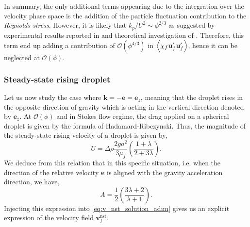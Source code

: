 In summary, the only additional terms appearing due to the integration over the velocity phase space is the addition of the particle fluctuation contribution to the \textit{Reynolds stress}. 
However, it is likely that $k_p/U^2 \sim \phi^{2/3}$ as suggested by experimental results reported in \citet{guazzelli2011fluctuations} and theoretical investigation of \citet{caflisch1985variance}.
Therefore, this term end up adding a contribution of $\mathcal{O}(\phi^{4/3})$ in $\left<\chi_f \textbf{u}_f'\textbf{u}_f'\right>$, hence it can be neglected at $\mathcal{O}(\phi)$. 



\subsubsection{Steady-state rising droplet}

Let us now study the case where $\textbf{k} = - \textbf{e} = \textbf{e}_z$, meaning that the droplet rises in the opposite direction of gravity which is acting in the vertical direction denoted by $\textbf{e}_z$.  
At $\mathcal{O}(\phi)$ and in Stokes flow regime, the drag applied on a spherical droplet is given by the formula of Hadamard-Ribczynski.
Thus, the magnitude of the steady-state rising velocity of a droplet is given by, 
\begin{equation}
    U = \Delta \rho \frac{2 g a^2}{3 \mu_f }\left(\frac{1+\lambda}{2+3\lambda}\right).
    \label{eq:U_isolated}
\end{equation}
We deduce from this relation that in this specific situation, i.e. when the direction of the relative velocity \textbf{e} is aligned with the gravity acceleration direction, we have, 
\begin{equation}
    A = \frac{1}{2}\left(\frac{3\lambda +2}{\lambda +1}\right). 
    \label{eq:closure_A}
\end{equation}
Injecting this expression into \ref{eq:v_nst_solution_adim} gives us an explicit expression of the velocity field $\textbf{v}^\text{nst}_f$. 

